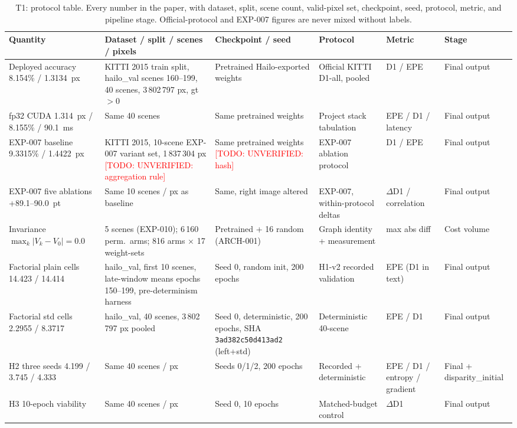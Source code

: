 \documentclass[conference]{IEEEtran}
\newcommand{\todo}[1]{\textcolor{red}{[TODO: #1]}}
\begin{document}
\begin{table}[t]
\centering
\footnotesize
\caption{T1: protocol table. Every number in the paper, with dataset, split, scene count, valid-pixel set, checkpoint, seed, protocol, metric, and pipeline stage. Official-protocol and EXP-007 figures are never mixed without labels.}
\label{tab:t1}
\begin{tabular}{p{2.6cm}p{2.2cm}p{2.6cm}p{2.4cm}p{2.2cm}p{2.2cm}}
\toprule
Quantity & Dataset / split / scenes / pixels & Checkpoint / seed & Protocol & Metric & Stage \\
\midrule
Deployed accuracy 8.154\% / 1.3134~px & KITTI 2015 train split, hailo\_val scenes 160--199, 40 scenes, 3\,802\,797 px, gt${>}0$ & Pretrained Hailo-exported weights & Official KITTI D1-all, pooled & D1 / EPE & Final output \\
fp32 CUDA 1.314~px / 8.155\% / 90.1~ms & Same 40 scenes & Same pretrained weights & Project stack tabulation & EPE / D1 / latency & Final output \\
EXP-007 baseline 9.3315\% / 1.4422~px & KITTI 2015, 10-scene EXP-007 variant set, 1\,837\,304 px \todo{UNVERIFIED: aggregation rule} & Same pretrained weights \todo{UNVERIFIED: hash} & EXP-007 ablation protocol & D1 / EPE & Final output \\
EXP-007 five ablations +89.1--90.0~pt & Same 10 scenes / px as baseline & Same, right image altered & EXP-007, within-protocol deltas & $\Delta$D1 / correlation & Final output \\
Invariance $\max_k|V_k-V_0|=0.0$ & 5 scenes (EXP-010); 6\,160 perm.\ arms; 816 arms $\times$ 17 weight-sets & Pretrained + 16 random (ARCH-001) & Graph identity + measurement & max abs diff & Cost volume \\
Factorial plain cells 14.423 / 14.414 & hailo\_val, first 10 scenes, late-window means epochs 150--199, pre-determinism harness & Seed 0, random init, 200 epochs & H1-v2 recorded validation & EPE (D1 in text) & Final output \\
Factorial std cells 2.2955 / 8.3717 & hailo\_val, 40 scenes, 3\,802\,797 px pooled & Seed 0, deterministic, 200 epochs, SHA \texttt{3ad382c50d413ad2} (left+std) & Deterministic 40-scene & EPE / D1 & Final output \\
H2 three seeds 4.199 / 3.745 / 4.333 & Same 40 scenes / px & Seeds 0/1/2, 200 epochs & Recorded + deterministic & EPE / D1 / entropy / gradient & Final + disparity\_initial \\
H3 10-epoch viability & Same 40 scenes / px & Seed 0, 10 epochs & Matched-budget control & $\Delta$D1 & Final output \\

\end{tabular}
\end{table}
\end{document}
